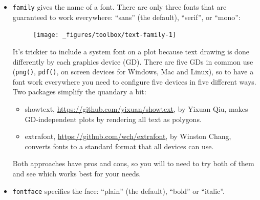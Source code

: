 \begin{itemize}
\item
  \texttt{family} gives the name of a font. There are only three fonts
  that are guaranteed to work everywhere: ``sans'' (the default),
  ``serif'', or ``mono'':

\begin{Shaded}
\begin{Highlighting}[]
\StringTok{ }\NormalTok{(} \NormalTok{, } \NormalTok{:}\NormalTok{, } \NormalTok{(}\NormalTok{, }\NormalTok{, }\NormalTok{))}
\StringTok{ }
\StringTok{  }\NormalTok{(}\NormalTok{(}  
\end{Highlighting}
\end{Shaded}

  \begin{figure}[H]
    \texttt{[image: \_figures/toolbox/text-family-1]}
  \end{figure}

  It's trickier to include a system font on a plot because text drawing
  is done differently by each graphics device (GD). There are five GDs
  in common use (\texttt{png()}, \texttt{pdf()}, on screen devices for
  Windows, Mac and Linux), so to have a font work everywhere you need to
  configure five devices in five different ways. Two packages simplify
  the quandary a bit:

  \begin{itemize}
  \tightlist
  \item
    showtext, \url{https://github.com/yixuan/showtext}, by Yixuan Qiu,
    makes GD-independent plots by rendering all text as polygons.
  \item
    extrafont, \url{https://github.com/wch/extrafont}, by Winston Chang,
    converts fonts to a standard format that all devices can use.
  \end{itemize}

  Both approaches have pros and cons, so you will to need to try both of
  them and see which works best for your needs. 
\item
  \texttt{fontface} specifies the face: ``plain'' (the default),
  ``bold'' or ``italic''. 


\end{itemize}
